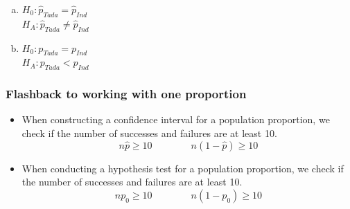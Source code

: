 \documentclass[notes,11pt, aspectratio=169]{beamer}
\begin{document}
\begin{frame}


\begin{enumerate}[(a)]
\item $H_0:  \hat{p}_{Tada} = \hat{p}_{Ind}$ \\
$H_A:  \hat{p}_{Tada} \ne \hat{p}_{Ind}$
\item $H_0:  p_{Tada} = p_{Ind}$ \\
$H_A:  p_{Tada} < p_{Ind}$
\end{enumerate}


\end{frame}


\begin{frame}
\frametitle{Flashback to working with one proportion}

\begin{itemize}

\item When constructing a confidence interval for a population proportion, we check if the  number of successes and failures are at least 10.
\[ n\hat{p} \ge 10 \qquad \qquad n(1-\hat{p}) \ge 10 \]

\pause

\item When conducting a hypothesis test for a population proportion, we check if the  number of successes and failures are at least 10.
\[ np_0 \ge 10 \qquad \qquad n(1-p_0) \ge 10 \]

\end{itemize}

\end{frame}

\end{document}
